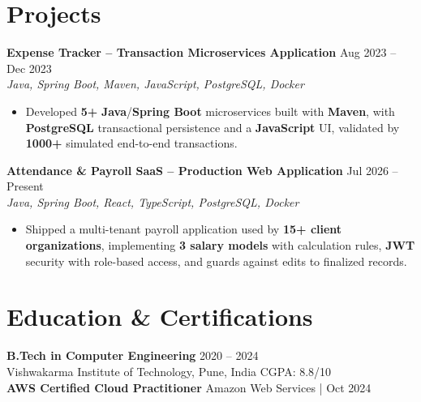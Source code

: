 \documentclass[a4paper,10pt]{article}
\begin{document}
\section*{Projects}

\textbf{Expense Tracker -- Transaction Microservices Application} \hfill Aug 2023 -- Dec 2023 \\
\textit{Java, Spring Boot, Maven, JavaScript, PostgreSQL, Docker}
\begin{itemize}[leftmargin=*]
    \item Developed \textbf{5+} \textbf{Java}/\textbf{Spring Boot} microservices built with \textbf{Maven}, with \textbf{PostgreSQL} transactional persistence and a \textbf{JavaScript} UI, validated by \textbf{1000+} simulated end-to-end transactions.
\end{itemize}

\textbf{Attendance \& Payroll SaaS -- Production Web Application} \hfill Jul 2026 -- Present \\
\textit{Java, Spring Boot, React, TypeScript, PostgreSQL, Docker}
\begin{itemize}[leftmargin=*]
    \item Shipped a multi-tenant payroll application used by \textbf{15+ client organizations}, implementing \textbf{3 salary models} with calculation rules, \textbf{JWT} security with role-based access, and guards against edits to finalized records.
\end{itemize}

\section*{Education \& Certifications}
\textbf{B.Tech in Computer Engineering} \hfill 2020 -- 2024 \\
Vishwakarma Institute of Technology, Pune, India \hfill CGPA: 8.8/10 \\
\textbf{AWS Certified Cloud Practitioner} \hfill Amazon Web Services \;|\; Oct 2024
\end{document}
